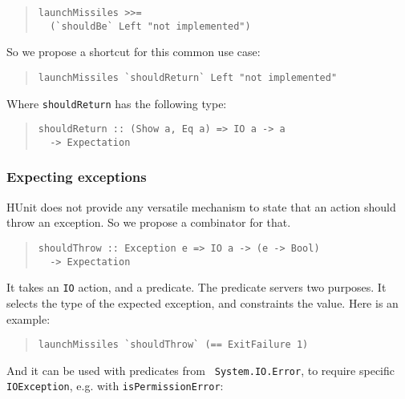 \documentclass[preprint]{sigplanconf}
\begin{document}
\begin{quote}\small\begin{verbatim}
launchMissiles >>=
  (`shouldBe` Left "not implemented")
\end{verbatim}\end{quote}

\noindent So we propose a shortcut for this common use case:

\begin{quote}\small\begin{verbatim}
launchMissiles `shouldReturn` Left "not implemented"
\end{verbatim}\end{quote}

\noindent Where \verb|shouldReturn| has the following type:

\begin{quote}\small\begin{verbatim}
shouldReturn :: (Show a, Eq a) => IO a -> a
  -> Expectation
\end{verbatim}\end{quote}


\subsubsection{Expecting exceptions}

HUnit does not provide any versatile mechanism to state that an action
should throw an exception.  So we propose a combinator for that.

\begin{quote}\small\begin{verbatim}
shouldThrow :: Exception e => IO a -> (e -> Bool)
  -> Expectation
\end{verbatim}\end{quote}

\noindent It takes an {\tt IO} action, and a predicate.  The predicate
servers two purposes.  It selects the type of the expected exception,
and constraints the value.  Here is an example:

\begin{quote}\small\begin{verbatim}
launchMissiles `shouldThrow` (== ExitFailure 1)
\end{verbatim}\end{quote}

\noindent And it can be used with predicates from {\tt
System.IO.Error}, to require specific {\tt IOException}, e.g.  with
{\tt isPermissionError}:
\end{document}
